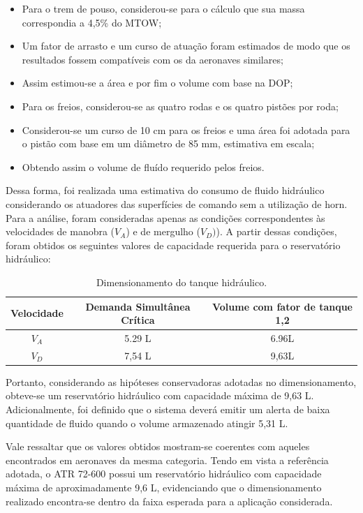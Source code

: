 \begin{itemize}
    \item Para o trem de pouso, considerou-se para o cálculo que sua massa correspondia a 4,5\% do MTOW;
    \item  Um fator de arrasto e um curso de atuação foram estimados de modo que os resultados fossem compatíveis com os da aeronaves similares;
    \item Assim estimou-se a área e por fim o volume com base na DOP;
    \item Para os freios, considerou-se as quatro rodas e os quatro pistões por roda;
    \item Considerou-se um curso de 10 cm para os freios e uma área foi adotada para o pistão com base em um diâmetro de 85 mm, estimativa em escala;
    \item Obtendo assim o volume de fluído requerido pelos freios.
\end{itemize}

Dessa forma, foi realizada uma estimativa do consumo de fluido hidráulico considerando os atuadores das superfícies de comando sem a utilização de horn. Para a análise, foram consideradas apenas as condições correspondentes às velocidades de manobra ($V_A$) e de mergulho ($V_D)$). A partir dessas condições, foram obtidos os seguintes valores de capacidade  requerida para o reservatório hidráulico:

\begin{table}[H]
\centering
\caption{Dimensionamento do tanque hidráulico.}
\label{tab:dimensionamento_tanque}
\begin{tabular}{|c|c|c|}
\hline
\textbf{Velocidade} & \textbf{Demanda Simultânea Crítica} & \textbf{Volume com fator de tanque 1,2} \\
\hline
$V_A$ & 5.29 L & 6.96L \\
\hline
$V_D$ & 7,54 L & 9,63L \\
\hline
\end{tabular}
\end{table}


Portanto, considerando as hipóteses conservadoras adotadas no dimensionamento, obteve-se um reservatório hidráulico com capacidade máxima de 9,63 L. Adicionalmente, foi definido que o sistema deverá emitir um alerta de baixa quantidade de fluido quando o volume armazenado atingir 5,31 L.

Vale ressaltar que os valores obtidos mostram-se coerentes com aqueles encontrados em aeronaves da mesma categoria. Tendo em vista a referência adotada, o ATR 72-600 possui um reservatório hidráulico com capacidade máxima de aproximadamente 9,6 L, evidenciando que o dimensionamento realizado encontra-se dentro da faixa esperada para a aplicação considerada.



